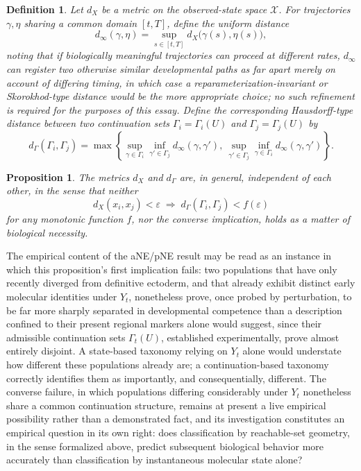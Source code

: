 \documentclass[11pt]{article}
\newtheorem{definition}{Definition}
\newtheorem{proposition}{Proposition}
\begin{document}
\begin{definition}
Let $d_X$ be a metric on the observed-state space $\mathcal{X}$. For trajectories $\gamma, \eta$ sharing a common domain $[t,T]$, define the uniform distance
\begin{equation}
d_\infty(\gamma, \eta) = \sup_{s \in [t,T]} d_X\bigl(\gamma(s), \eta(s)\bigr),
\end{equation}
noting that if biologically meaningful trajectories can proceed at different rates, $d_\infty$ can register two otherwise similar developmental paths as far apart merely on account of differing timing, in which case a reparameterization-invariant or Skorokhod-type distance would be the more appropriate choice; no such refinement is required for the purposes of this essay. Define the corresponding Hausdorff-type distance between two continuation sets $\Gamma_i = \Gamma_i(U)$ and $\Gamma_j = \Gamma_j(U)$ by
\begin{equation}
d_\Gamma(\Gamma_i, \Gamma_j) = \max\left\{ \sup_{\gamma \in \Gamma_i} \inf_{\gamma' \in \Gamma_j} d_\infty(\gamma, \gamma'),\ \sup_{\gamma' \in \Gamma_j} \inf_{\gamma \in \Gamma_i} d_\infty(\gamma, \gamma') \right\}.
\end{equation}
\end{definition}

\begin{proposition}
The metrics $d_X$ and $d_\Gamma$ are, in general, independent of each other, in the sense that neither
\begin{equation}
d_X(x_i, x_j) < \varepsilon \;\Longrightarrow\; d_\Gamma(\Gamma_i, \Gamma_j) < f(\varepsilon)
\end{equation}
for any monotonic function $f$, nor the converse implication, holds as a matter of biological necessity.
\end{proposition}

The empirical content of the aNE/pNE result may be read as an instance in which this proposition's first implication fails: two populations that have only recently diverged from definitive ectoderm, and that already exhibit distinct early molecular identities under $Y_t$, nonetheless prove, once probed by perturbation, to be far more sharply separated in developmental competence than a description confined to their present regional markers alone would suggest, since their admissible continuation sets $\Gamma_t(U)$, established experimentally, prove almost entirely disjoint. A state-based taxonomy relying on $Y_t$ alone would understate how different these populations already are; a continuation-based taxonomy correctly identifies them as importantly, and consequentially, different. The converse failure, in which populations differing considerably under $Y_t$ nonetheless share a common continuation structure, remains at present a live empirical possibility rather than a demonstrated fact, and its investigation constitutes an empirical question in its own right: does classification by reachable-set geometry, in the sense formalized above, predict subsequent biological behavior more accurately than classification by instantaneous molecular state alone?
\end{document}
